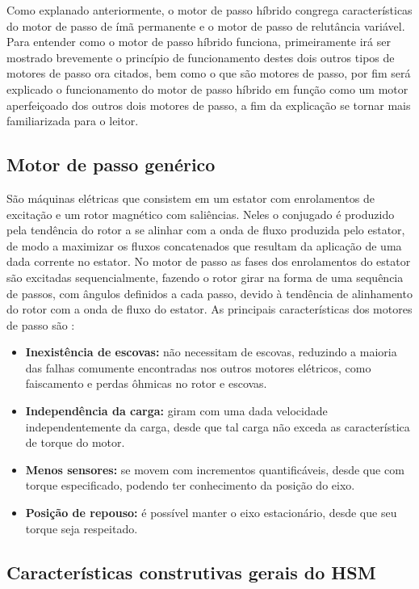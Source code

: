Como explanado anteriormente, o motor de passo híbrido congrega características do motor de passo de ímã permanente e o motor de passo de relutância variável. Para entender como o motor de passo híbrido funciona, primeiramente irá ser mostrado brevemente o princípio de funcionamento destes dois outros tipos de motores de passo ora citados, bem como o que são motores de passo, por fim será explicado o funcionamento do motor de passo híbrido em função como um motor aperfeiçoado dos outros dois motores de passo, a fim da explicação se tornar mais familiarizada para o leitor.  

	\subsection{Motor de passo genérico}
	São máquinas elétricas que consistem em um estator com enrolamentos de excitação e um rotor magnético com saliências. Neles o conjugado é produzido pela tendência do rotor a se alinhar com a onda de fluxo produzida pelo estator, de modo a maximizar os fluxos concatenados que resultam da aplicação de uma dada corrente no estator. No motor de passo as fases dos enrolamentos do estator são excitadas sequencialmente, fazendo o rotor girar na forma de uma sequência de passos, com ângulos definidos a cada passo, devido à tendência de alinhamento do rotor com a onda de fluxo do estator. \cite{Fitz} As principais características dos motores de passo são \cite{MoonsHSM}:
	
	\begin{itemize}
		\item \textbf{Inexistência de escovas:} não necessitam de escovas, reduzindo a maioria das falhas comumente encontradas nos outros motores elétricos, como faiscamento e perdas ôhmicas no rotor e escovas.
		\item \textbf{Independência da carga:} giram com uma dada velocidade independentemente da carga, desde que tal carga não exceda as característica de torque do motor.
		\item \textbf{Menos sensores:} se movem com incrementos quantificáveis, desde que com torque especificado, podendo ter conhecimento da posição do eixo.
		\item \textbf{Posição de repouso:} é possível manter o eixo estacionário, desde que seu torque seja respeitado. 
	\end{itemize}
	
	\subsection{Características construtivas gerais do HSM}
	
